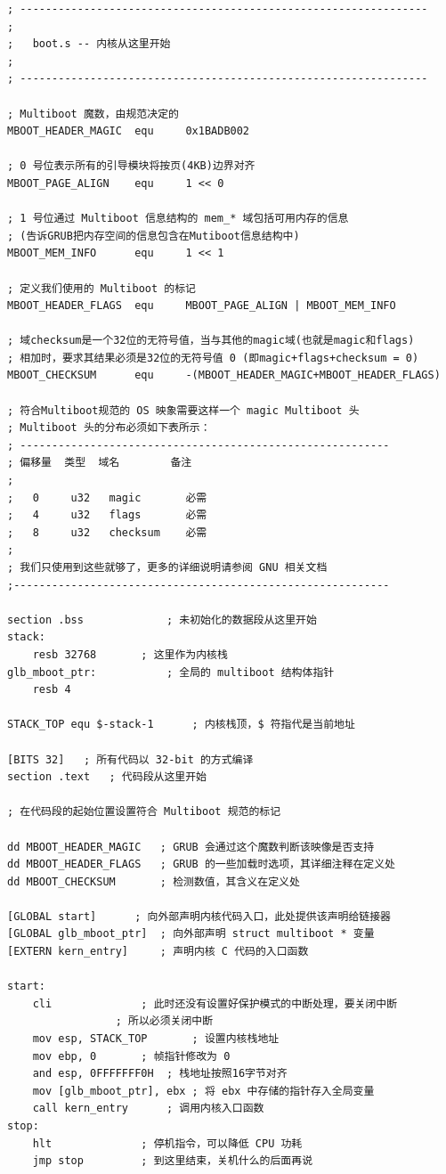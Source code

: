 \begin{lstlisting}[language = {[x86masm]Assembler}, label = boot/boot.s, caption = boot/boot.s]
; ----------------------------------------------------------------
;
; 	boot.s -- 内核从这里开始
;
; ----------------------------------------------------------------

; Multiboot 魔数，由规范决定的
MBOOT_HEADER_MAGIC 	equ 	0x1BADB002

; 0 号位表示所有的引导模块将按页(4KB)边界对齐
MBOOT_PAGE_ALIGN 	equ 	1 << 0

; 1 号位通过 Multiboot 信息结构的 mem_* 域包括可用内存的信息
; (告诉GRUB把内存空间的信息包含在Mutiboot信息结构中)
MBOOT_MEM_INFO 		equ 	1 << 1    

; 定义我们使用的 Multiboot 的标记
MBOOT_HEADER_FLAGS 	equ 	MBOOT_PAGE_ALIGN | MBOOT_MEM_INFO

; 域checksum是一个32位的无符号值，当与其他的magic域(也就是magic和flags)
; 相加时，要求其结果必须是32位的无符号值 0 (即magic+flags+checksum = 0)
MBOOT_CHECKSUM 		equ 	-(MBOOT_HEADER_MAGIC+MBOOT_HEADER_FLAGS)

; 符合Multiboot规范的 OS 映象需要这样一个 magic Multiboot 头
; Multiboot 头的分布必须如下表所示：
; ----------------------------------------------------------
; 偏移量  类型  域名        备注
;
;   0     u32   magic       必需
;   4     u32   flags       必需 
;   8     u32   checksum    必需 
;
; 我们只使用到这些就够了，更多的详细说明请参阅 GNU 相关文档
;-----------------------------------------------------------

section .bss 			 ; 未初始化的数据段从这里开始
stack:
	resb 32768 	 	 ; 这里作为内核栈
glb_mboot_ptr: 			 ; 全局的 multiboot 结构体指针
	resb 4

STACK_TOP equ $-stack-1 	 ; 内核栈顶，$ 符指代是当前地址

[BITS 32]  	; 所有代码以 32-bit 的方式编译
section .text 	; 代码段从这里开始

; 在代码段的起始位置设置符合 Multiboot 规范的标记

dd MBOOT_HEADER_MAGIC 	; GRUB 会通过这个魔数判断该映像是否支持
dd MBOOT_HEADER_FLAGS   ; GRUB 的一些加载时选项，其详细注释在定义处
dd MBOOT_CHECKSUM       ; 检测数值，其含义在定义处

[GLOBAL start] 		; 向外部声明内核代码入口，此处提供该声明给链接器
[GLOBAL glb_mboot_ptr] 	; 向外部声明 struct multiboot * 变量
[EXTERN kern_entry] 	; 声明内核 C 代码的入口函数

start:
	cli  			 ; 此时还没有设置好保护模式的中断处理，要关闭中断
				 ; 所以必须关闭中断
	mov esp, STACK_TOP  	 ; 设置内核栈地址
	mov ebp, 0 		 ; 帧指针修改为 0
	and esp, 0FFFFFFF0H	 ; 栈地址按照16字节对齐
	mov [glb_mboot_ptr], ebx ; 将 ebx 中存储的指针存入全局变量
	call kern_entry		 ; 调用内核入口函数
stop:
	hlt 			 ; 停机指令，可以降低 CPU 功耗
	jmp stop 		 ; 到这里结束，关机什么的后面再说
\end{lstlisting} 

